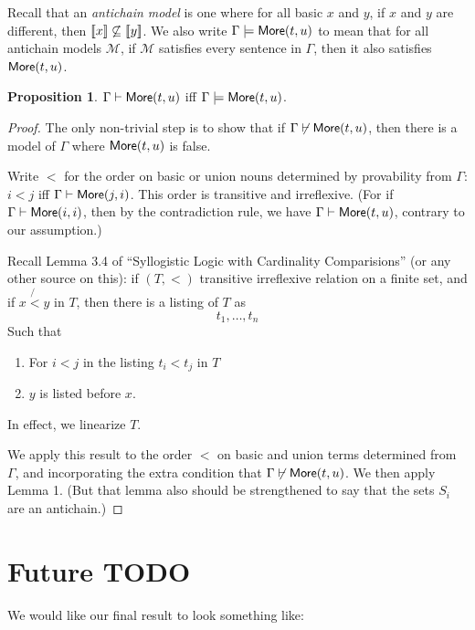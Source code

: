 \documentclass[12pt]{article}
\newcommand{\more}{\mbox{\sf More}}
\theoremstyle{definition}
\newtheorem{proposition}{Proposition}
\newcommand{\semantics}[1]{[\![\mbox{\em $ #1 $\/}]\!]}
\newcommand{\Model}{\mathcal{M}}
\newcommand{\proves}{\vdash}
\begin{document}
Recall that an \emph{antichain model} is one where for all basic $x$ and $y$, if $x$ and $y$ are different,
then $\semantics{x} \not\subseteq \semantics{y}$.
We also write $\Gamma\models\more(t,u)$
to mean that for all {antichain models} $\Model$, if $\Model$ satisfies every sentence in $\Gamma$,
then it also satisfies $\more(t,u)$.

\begin{proposition}
$\Gamma\proves \more(t,u)$ iff $\Gamma\models\more(t,u)$.
\end{proposition}

\begin{proof}
The only non-trivial step is to show that if 
$\Gamma\not\proves \more(t,u)$, then there is a model of $\Gamma$
where $\more(t,u)$ is false.

Write $<$ for the order on basic or union nouns determined by provability from
$\Gamma$:  $i < j$ iff $\Gamma\proves \more(j,i)$.
This order is transitive and irreflexive.   (For if $\Gamma\proves\more(i,i)$,
then by the contradiction rule,  we have $\Gamma\proves \more(t,u)$, 
contrary to our assumption.)

Recall Lemma 3.4 of ``Syllogistic Logic with Cardinality Comparisions'' 
(or any other source on this): if $(T, <)$ transitive irreflexive relation
on a finite set,
and if $x \not{<} y$ in $T$, then there is a listing of $T$ as 
\[ t_1, \ldots, t_n \]
Such that 
\begin{enumerate}
    \item For $i < j$ in the listing $t_i < t_j$ in $T$
    \item $y$ is listed before $x$.
\end{enumerate}
In effect, we linearize $T$.

We apply this result to the order $<$ on 
basic and union terms determined from $\Gamma$, 
and incorporating the extra condition that 
$\Gamma\not\proves \more(t,u)$.
We then apply Lemma 1.  (But that lemma also should be strengthened
to say that the sets $S_i$ are an antichain.)
\end{proof}


\section{Future TODO}

We would like our final result to look something like:
\end{document}
